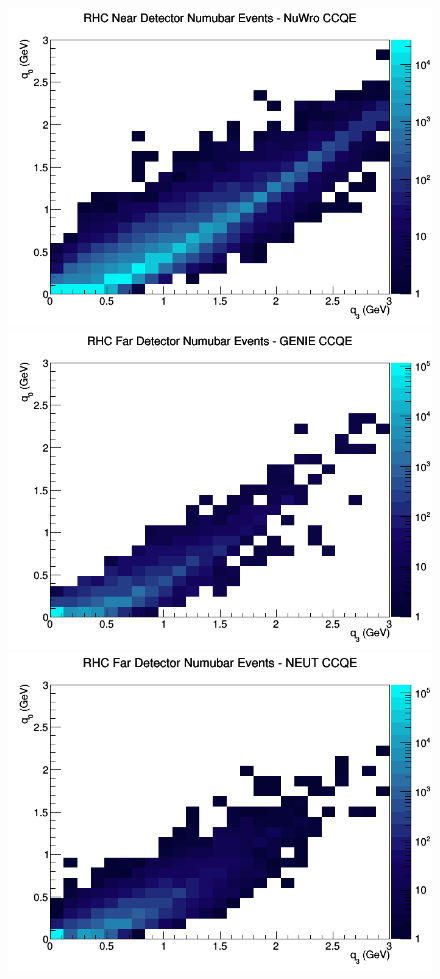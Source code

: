\begin{figure}[h]
\includegraphics[width=\linewidth]{eff_q0_q3/GAr/CCQE_RHC_ND_numubar_q3_q0_NuWro.png}
\endminipage
\newline
{}
\includegraphics[width=\linewidth]{eff_q0_q3/GAr/CCQE_RHC_FD_numubar_q3_q0_GENIE.png}
\endminipage
{}
\includegraphics[width=\linewidth]{eff_q0_q3/GAr/CCQE_RHC_FD_numubar_q3_q0_NEUT.png}

\end{figure}
